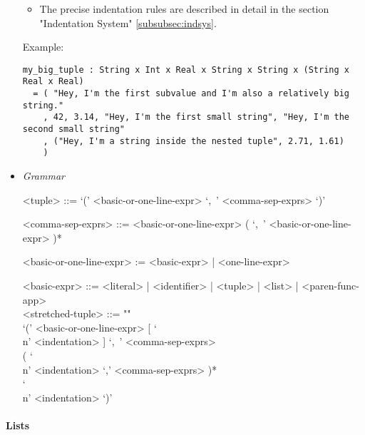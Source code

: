 \documentclass{article}
\begin{document}
\begin{itemize}
\begin{itemize}
\item
The precise indentation rules are described in detail in the section
"Indentation System" \ref{subsubsec:indsys}.
\end{itemize}
Example:
\begin{verbatim}
my_big_tuple : String x Int x Real x String x String x (String x Real x Real)
  = ( "Hey, I'm the first subvalue and I'm also a relatively big string."
    , 42, 3.14, "Hey, I'm the first small string", "Hey, I'm the second small string"
    , ("Hey, I'm a string inside the nested tuple", 2.71, 1.61)
    )
\end{verbatim}

\item \textit{Grammar}
\begin{grammar}
<tuple> ::= `(' <basic-or-one-line-expr> `,\ ' <comma-sep-exprs> `)'

<comma-sep-exprs> ::=
<basic-or-one-line-expr> ( `,\ ' <basic-or-one-line-expr> )*

<basic-or-one-line-expr> := <basic-expr> | <one-line-expr>

<basic-expr> ::=
<literal> | <identifier> | <tuple> | <list> | <paren-func-app>\\

<stretched-tuple> ::= ""\\
`(' <basic-or-one-line-expr> [ `\\n' <indentation> ] `,\ ' <comma-sep-exprs> \\
( `\\n' <indentation> `,' <comma-sep-exprs> )* \\
`\\n' <indentation> `)'
\end{grammar}

\end{itemize}

\paragraph{Lists}
\end{document}
